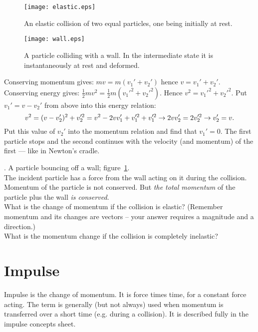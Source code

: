 \documentclass[a4paper,11pt]{article}
\def\half{{\textstyle \frac{1}{2}}}
\def\nl{\hfil\break}
\begin{document}
\begin{figure}[h!]%
\begin{minipage}{.45\textwidth}
  \centering
  \texttt{[image: elastic.eps]}
  \caption{An elastic collision of two equal particles, one being initially at rest.}
  \label{fig:elastic}
\end{minipage}\hfill
\begin{minipage}{.45\textwidth}
  \centering
  \texttt{[image: wall.eps]}
  \caption{A particle colliding with a wall.  In the intermediate state it is instantaneously at rest and deformed.}
  \label{fig:wall}
\end{minipage}
\end{figure}

\nl Conserving momentum gives: $m v = m (v_1' + v_2')$ hence $v = v_1' + v_2'$.\\
Conserving energy gives: $\half m v^2 = \half m (v_1'^2 + v_2'^2)$.  Hence
$v^2 = v_1'^2 + v_2'^2$.
\nl
Put $v_1'  = v - v_2'$ from above into this energy relation:
\begin{equation*} v^2 = (v - v_2')^2 + v_2'^2  = v^2 - 2 v v_1' +v_1'^2 + v_1'^2\\
\rightarrow 2 v v_2' = 2 v_2'^2  \rightarrow v_2' = v .
\end{equation*}
Put this value of $v_2'$ into the momentum relation and find that $v_1' = 0$.
\nl
The first particle stops and the second continues with the velocity (and momentum) of the first --- like in Newton's cradle.

\nl
3.  A particle bouncing off a wall; figure~\ref{fig:wall}.\\

The incident particle has a force from the wall acting on it during the collision.  Momentum of the particle is not conserved. But \textit{the total momentum} of the particle plus the wall \textit{is conserved}.\\
  What is the change of momentum if the collision is elastic? (Remember momentum and its changes are vectors -- your answer requires a magnitude and a direction.)\\
 What is the momentum change if the collision is completely inelastic?


\section{Impulse}
Impulse is the change of momentum.  It is force times time, for a constant force acting.  The term is generally (but not always) used when momentum is transferred over a short time (e.g. during a collision).  It is described fully in the impulse concepts sheet.
\end{document}
